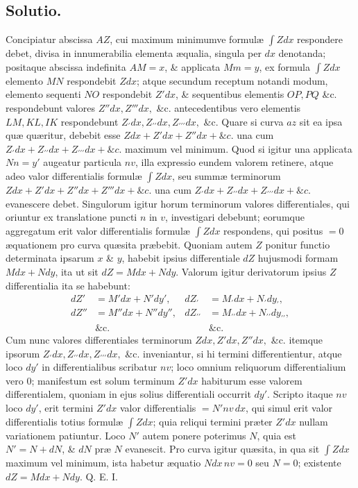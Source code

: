 \subsection*{Solutio.}
Concipiatur abscissa $AZ$, cui maximum minimumve formulæ $\int Zdx$ respondere debet, divisa in innumerabilia elementa æqualia, singula per $dx$ denotanda; positaque abscissa indefinita $AM=x$, \& applicata $Mm=y$, ex formula $\int Zdx$ elemento $MN$ respondebit $Zdx$; atque secundum receptum notandi modum, elemento sequenti $NO$ respondebit $Z'dx$, \& sequentibus elementis $OP,PQ$ \&c. respondebunt valores $Z''dx,Z'''dx,$ \&c. antecedentibus vero elementis $LM,KL,IK$ respondebunt $Z_{\prime}dx,\allowbreak Z_{\prime\prime}dx,\allowbreak Z_{\prime\prime\prime}dx,$ \&c. Quare si curva $az$ sit ea ipsa quæ quæritur, debebit esse $Zdx+Z'dx+Z''dx+\&c.$ una cum  $Z_{\prime}dx+Z_{\prime\prime}dx+Z_{\prime\prime\prime}dx+\&c.$ maximum vel minimum. Quod si igitur una applicata $Nn=y'$ augeatur particula $nv$, illa expressio eundem valorem retinere, atque adeo valor differentialis formulæ $\int Zdx$, seu summæ terminorum $Zdx+Z'dx+Z''dx+Z'''dx+\&c.$ una cum $Z_{\prime}dx+Z_{\prime\prime}dx+Z_{\prime\prime\prime}dx+\&c.$ evanescere debet. Singulorum igitur horum terminorum valores differentiales, qui oriuntur ex translatione puncti $n$ in $v$, investigari debebunt; eorumque aggregatum erit valor differentialis formulæ $\int Zdx$ respondens, qui positus $=0$ æquationem pro curva quæsita præbebit. Quoniam autem $Z$ ponitur functio determinata ipsarum $x$ \& $y$, habebit ipsius differentiale $dZ$ hujusmodi formam $Mdx+Ndy$, ita ut sit $dZ=Mdx+Ndy$. Valorum igitur derivatorum ipsius $Z$ differentialia ita se habebunt:
\[
\begin{aligned}
dZ'&=M'dx+N'dy',&dZ_{\prime}&=M_{\prime}dx+N_{\prime}dy_{\prime},\\
dZ''&=M''dx+N''dy'',&dZ_{\prime\prime}&=M_{\prime\prime}dx+N_{\prime\prime}dy_{\prime\prime},\\
&\text{\&c.}&&\text{\&c.}
\end{aligned}
\]
Cum nunc valores differentiales terminorum $Zdx,Z'dx,Z''dx,$ \&c. itemque ipsorum $Z_{\prime}dx,\allowbreak Z_{\prime\prime}dx,\allowbreak Z_{\prime\prime\prime}dx,$ \&c. inveniantur, si hi termini differentientur, atque loco $dy'$ in differentialibus scribatur $nv$; loco omnium reliquorum differentialium vero $0$; manifestum est solum terminum $Z'dx$ habiturum esse valorem differentialem, quoniam in ejus solius differentiali occurrit $dy'$. Scripto itaque $nv$ loco $dy'$, erit termini $Z'dx$ valor differentialis $=N'nv\,dx$, qui simul erit valor differentialis totius formulæ $\int Zdx$; quia reliqui termini præter $Z'dx$ nullam variationem patiuntur. Loco $N'$ autem ponere poterimus $N$, quia est $N'=N+dN$, \& $dN$ præ $N$ evanescit. Pro curva igitur quæsita, in qua sit $\int Zdx$ maximum vel minimum, ista habetur æquatio $Ndx\,nv=0$ seu $N=0$; existente $dZ=Mdx+Ndy$. Q. E. I.

